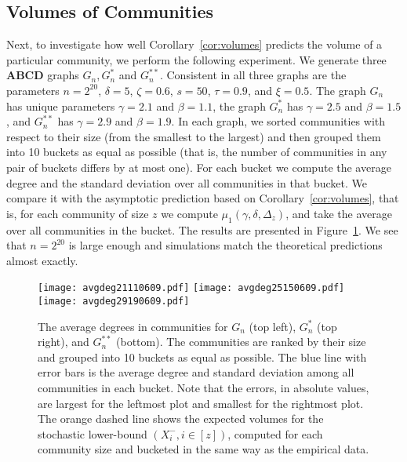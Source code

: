 \documentclass[12pt]{article}
\theoremstyle{definition}
\theoremstyle{remark}
\theoremstyle{remark}
\numberwithin{theorem}{section}
\newcommand{\moment}[2]{\ensuremath{\mu_{#1}(#2)}}
\begin{document}
\subsection{Volumes of Communities}

Next, to investigate how well Corollary~\ref{cor:volumes} predicts the volume of a particular community, we perform the following experiment. We generate three \textbf{ABCD} graphs $G_n, G_n^*$ and $G_n^{**}$. Consistent in all three graphs are the parameters $n = 2^{20}$, $\delta = 5$, $\zeta = 0.6$, $s = 50$, $\tau = 0.9$, and $\xi = 0.5$. The graph $G_n$ has unique parameters $\gamma = 2.1$ and $\beta = 1.1$, the graph $G_n^*$ has $\gamma = 2.5$ and $\beta = 1.5$, and $G_n^{**}$ has $\gamma = 2.9$ and $\beta = 1.9$. In each graph, we sorted communities with respect to their size (from the smallest to the largest) and then grouped them into 10 buckets as equal as possible (that is, the number of communities in any pair of buckets differs by at most one). For each bucket we compute the average degree and the standard deviation over all communities in that bucket. We compare it with the asymptotic prediction based on Corollary~\ref{cor:volumes}, that is, for each community of size $z$ we compute $\moment{1}{\gamma,\delta,\Delta_z}$, and take the average over all communities in the bucket. The results are presented in Figure~\ref{fig:avgdeg2111}. We see that $n = 2^{20}$ is large enough and simulations match the theoretical predictions almost exactly.

\begin{figure}
\begin{center}
\texttt{[image: avgdeg21110609.pdf]}
\texttt{[image: avgdeg25150609.pdf]}
\texttt{[image: avgdeg29190609.pdf]}
\end{center}
\caption{The average degrees in communities for $G_n$ (top left), $G_n^*$ (top right), and $G_n^{**}$ (bottom). The communities are ranked by their size and grouped into 10 buckets as equal as possible. The blue line with error bars is the average degree and standard deviation among all communities in each bucket. Note that the errors, in absolute values, are largest for the leftmost plot and smallest for the rightmost plot. The orange dashed line shows the expected volumes for the stochastic lower-bound $(X_i^-,i \in [z])$, computed for each community size and bucketed in the same way as the empirical data. \label{fig:avgdeg2111}}
\end{figure}
\end{document}
